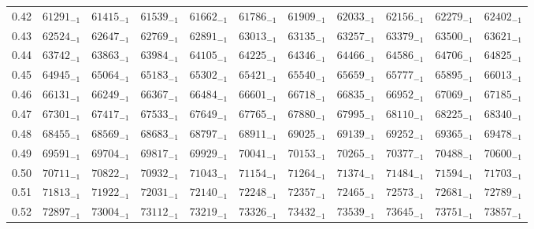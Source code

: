 \documentclass[10pt, a4paper]{article}
\begin{document}
\begin{center}
\begin{longtable}{c || c c c c c | c c c c c}
        0.42 & \({61291}_{-1}\) & \({61415}_{-1}\) & \({61539}_{-1}\) & \({61662}_{-1}\) & \({61786}_{-1}\) & \({61909}_{-1}\) & \({62033}_{-1}\) & \({62156}_{-1}\) & \({62279}_{-1}\) & \({62402}_{-1}\)\\
        0.43 & \({62524}_{-1}\) & \({62647}_{-1}\) & \({62769}_{-1}\) & \({62891}_{-1}\) & \({63013}_{-1}\) & \({63135}_{-1}\) & \({63257}_{-1}\) & \({63379}_{-1}\) & \({63500}_{-1}\) & \({63621}_{-1}\)\\
        0.44 & \({63742}_{-1}\) & \({63863}_{-1}\) & \({63984}_{-1}\) & \({64105}_{-1}\) & \({64225}_{-1}\) & \({64346}_{-1}\) & \({64466}_{-1}\) & \({64586}_{-1}\) & \({64706}_{-1}\) & \({64825}_{-1}\)\\
        0.45 & \({64945}_{-1}\) & \({65064}_{-1}\) & \({65183}_{-1}\) & \({65302}_{-1}\) & \({65421}_{-1}\) & \({65540}_{-1}\) & \({65659}_{-1}\) & \({65777}_{-1}\) & \({65895}_{-1}\) & \({66013}_{-1}\)\\
        0.46 & \({66131}_{-1}\) & \({66249}_{-1}\) & \({66367}_{-1}\) & \({66484}_{-1}\) & \({66601}_{-1}\) & \({66718}_{-1}\) & \({66835}_{-1}\) & \({66952}_{-1}\) & \({67069}_{-1}\) & \({67185}_{-1}\)\\
        0.47 & \({67301}_{-1}\) & \({67417}_{-1}\) & \({67533}_{-1}\) & \({67649}_{-1}\) & \({67765}_{-1}\) & \({67880}_{-1}\) & \({67995}_{-1}\) & \({68110}_{-1}\) & \({68225}_{-1}\) & \({68340}_{-1}\)\\
        0.48 & \({68455}_{-1}\) & \({68569}_{-1}\) & \({68683}_{-1}\) & \({68797}_{-1}\) & \({68911}_{-1}\) & \({69025}_{-1}\) & \({69139}_{-1}\) & \({69252}_{-1}\) & \({69365}_{-1}\) & \({69478}_{-1}\)\\
        0.49 & \({69591}_{-1}\) & \({69704}_{-1}\) & \({69817}_{-1}\) & \({69929}_{-1}\) & \({70041}_{-1}\) & \({70153}_{-1}\) & \({70265}_{-1}\) & \({70377}_{-1}\) & \({70488}_{-1}\) & \({70600}_{-1}\)\\
        \hline
        0.50 & \({70711}_{-1}\) & \({70822}_{-1}\) & \({70932}_{-1}\) & \({71043}_{-1}\) & \({71154}_{-1}\) & \({71264}_{-1}\) & \({71374}_{-1}\) & \({71484}_{-1}\) & \({71594}_{-1}\) & \({71703}_{-1}\)\\
        0.51 & \({71813}_{-1}\) & \({71922}_{-1}\) & \({72031}_{-1}\) & \({72140}_{-1}\) & \({72248}_{-1}\) & \({72357}_{-1}\) & \({72465}_{-1}\) & \({72573}_{-1}\) & \({72681}_{-1}\) & \({72789}_{-1}\)\\
        0.52 & \({72897}_{-1}\) & \({73004}_{-1}\) & \({73112}_{-1}\) & \({73219}_{-1}\) & \({73326}_{-1}\) & \({73432}_{-1}\) & \({73539}_{-1}\) & \({73645}_{-1}\) & \({73751}_{-1}\) & \({73857}_{-1}\)\\

\end{longtable}
\end{center}
\end{document}

